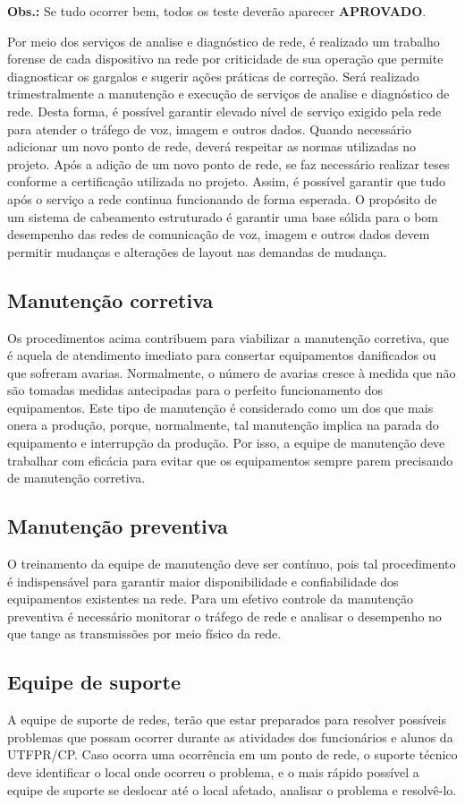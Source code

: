 \documentclass[	DIV=calc,%
							paper=a4,%
							fontsize=12pt,%
							onecolumn]{scrartcl}	 					%
\begin{document}
\textbf{Obs.:} Se tudo ocorrer bem, todos os teste deverão aparecer \textbf{APROVADO}.

Por meio dos serviços de analise e diagnóstico de rede, é realizado um trabalho forense de cada dispositivo na rede por criticidade de sua operação que permite diagnosticar os gargalos e sugerir ações práticas de correção.
Será realizado trimestralmente a manutenção e execução de serviços de analise e diagnóstico de rede. Desta forma, é possível garantir elevado nível de serviço exigido pela rede para atender o tráfego de voz, imagem e outros dados.
Quando necessário adicionar um novo ponto de rede, deverá respeitar as normas utilizadas no projeto. Após a adição de um novo ponto de rede, se faz necessário realizar teses conforme a certificação utilizada no projeto. Assim, é possível garantir que tudo após o serviço a rede continua funcionando de forma esperada.
O propósito de um sistema de cabeamento estruturado é garantir uma base sólida para o bom desempenho das redes de comunicação de voz, imagem e outros dados devem permitir mudanças e alterações de layout nas demandas de mudança.
\subsection{Manutenção corretiva}
Os procedimentos acima contribuem para viabilizar a manutenção corretiva, que é aquela de atendimento imediato para consertar equipamentos danificados ou que sofreram avarias. Normalmente, o número de avarias cresce à medida que não são tomadas medidas antecipadas para o perfeito funcionamento dos equipamentos.
Este tipo de manutenção é considerado como um dos que mais onera a produção, porque, normalmente, tal manutenção implica na parada do equipamento e interrupção da produção. Por isso, a equipe de manutenção deve trabalhar com eficácia para evitar que os equipamentos sempre parem precisando de manutenção corretiva.
\subsection{Manutenção preventiva}
O treinamento da equipe de manutenção deve ser contínuo, pois tal procedimento é indispensável para garantir maior disponibilidade e confiabilidade dos equipamentos existentes na rede. Para um efetivo controle da manutenção preventiva é necessário monitorar o tráfego de rede e analisar o desempenho no que tange as transmissões por meio físico da rede. 
\subsection{Equipe de suporte}
A equipe de suporte de redes, terão que estar preparados para resolver possíveis problemas que possam ocorrer durante as atividades dos funcionários e alunos da UTFPR/CP. Caso ocorra uma ocorrência em um ponto de rede, o suporte técnico deve identificar o local onde ocorreu o problema, e o mais rápido possível a equipe de suporte se deslocar até o local afetado, analisar o problema e resolvê-lo.
\end{document}
